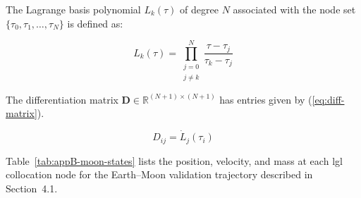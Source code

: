 \documentclass[dissertation, bookmarks]{../example/tex/grizz_thesis}
\begin{document}

\StartAppendices



The Lagrange basis polynomial $L_k(\tau)$ of degree $N$ associated with the node set
$\{\tau_0, \tau_1, \ldots, \tau_N\}$ is defined as:

\[
  L_k(\tau) = \prod_{\substack{j=0 \\ j \neq k}}^{N} \frac{\tau - \tau_j}{\tau_k - \tau_j}
\]

\blindtext


The differentiation matrix $\mathbf{D} \in \mathbb{R}^{(N+1)\times(N+1)}$ has entries given by (\ref{eq:diff-matrix}).

\begin{equation}
  D_{ij} = \dot{L}_j(\tau_i)
  \label{eq:diff-matrix}
\end{equation}

\blindtext



Table~\ref{tab:appB-moon-states} lists the position, velocity, and mass at each \gls{lgl}
collocation node for the Earth--Moon validation trajectory described in
Section~4.1.
\end{document}
